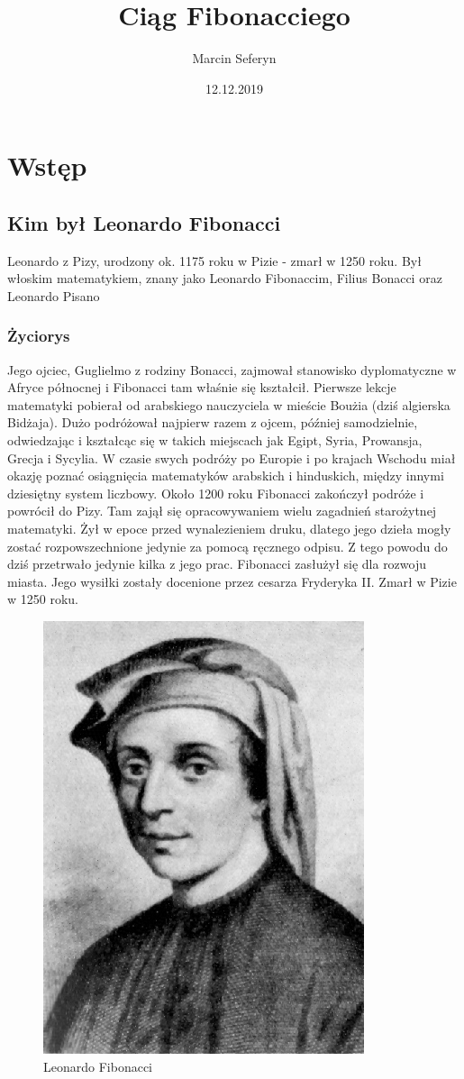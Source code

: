 \documentclass{report}
\title{Ciąg Fibonacciego}
\author{Marcin Seferyn}
\date{12.12.2019}
\begin{document}
\maketitle
\newpage
\tableofcontents
\newpage
\chapter{Wstęp}
\section{Kim był Leonardo Fibonacci}
\cite{fib}
Leonardo z Pizy, urodzony ok. 1175 roku w Pizie - zmarł w 1250 roku. Był włoskim matematykiem, znany jako Leonardo Fibonaccim, Filius Bonacci oraz Leonardo Pisano
\subsection{Życiorys}
Jego ojciec, Guglielmo z rodziny Bonacci, zajmował stanowisko dyplomatyczne w Afryce północnej i Fibonacci tam właśnie się kształcił. Pierwsze lekcje matematyki pobierał od arabskiego nauczyciela w mieście Boużia (dziś algierska Bidżaja). Dużo podróżował najpierw razem z ojcem, później samodzielnie, odwiedzając i kształcąc się w takich miejscach jak Egipt, Syria, Prowansja, Grecja i Sycylia. W czasie swych podróży po Europie i po krajach Wschodu miał okazję poznać osiągnięcia matematyków arabskich i hinduskich, między innymi dziesiętny system liczbowy.
Około 1200 roku Fibonacci zakończył podróże i powrócił do Pizy.
Tam zajął się opracowywaniem wielu zagadnień starożytnej matematyki. Żył w epoce przed wynalezieniem druku, dlatego jego dzieła mogły zostać rozpowszechnione jedynie za pomocą ręcznego odpisu. Z tego powodu do dziś przetrwało jedynie kilka z jego prac.
Fibonacci zasłużył się dla rozwoju miasta. Jego wysiłki zostały docenione przez cesarza Fryderyka II. Zmarł w Pizie w 1250 roku.


\begin{figure}[h]
\center
\includegraphics[scale=0.6]{fibo}
\caption{Leonardo Fibonacci}
\end{figure}
\newpage
\end{document}
